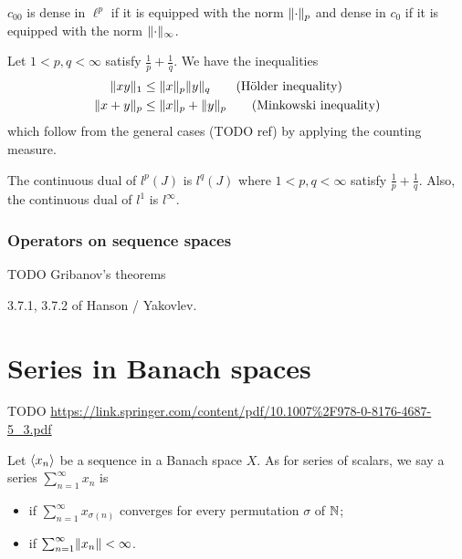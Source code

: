 \begin{lemma}
$c_{00}$ is dense in $\ell^p$ if it is equipped with the norm $\lVert\cdot\rVert_p$ and dense in $c_0$ if it is equipped with the norm $\lVert\cdot\rVert_\infty$.
\end{lemma}

Let $1<p,q<\infty$ satisfy $\frac{1}{p}+\frac{1}{q}$. We have the inequalities
\begin{align*}
\lVert xy\rVert_1 &\leq \lVert x\rVert_p\lVert y\rVert_q\qquad\text{(Hölder inequality)} \\
\lVert x+y\rVert_p &\leq \lVert x\rVert_p+\lVert y\rVert_p\qquad\text{(Minkowski inequality)}
\end{align*}
which follow from the general cases (TODO ref) by applying the counting measure.

\begin{proposition}
The continuous dual of $l^p(J)$ is $l^q(J)$ where $1<p,q<\infty$ satisfy $\frac{1}{p}+\frac{1}{q}$.
Also, the continuous dual of $l^1$ is $l^\infty$.
\end{proposition}

\subsubsection{Operators on sequence spaces}
TODO Gribanov's theorems

3.7.1, 3.7.2 of Hanson / Yakovlev.

\section{Series in Banach spaces}
TODO
\url{https://link.springer.com/content/pdf/10.1007%2F978-0-8176-4687-5_3.pdf}
\begin{definition}
Let $\left\langle x_n \right\rangle$ be a sequence in a Banach space $X$. As for series of scalars, we say a series $\sum_{n=1}^\infty x_n$ is
\begin{itemize}
\item {} if $\sum_{n=1}^\infty x_{\sigma(n)}$ converges for every permutation $\sigma$ of $\mathbb{N}$;
\item {} if $\sum_{n=1}^\infty \lVert x_n\rVert < \infty$.
\end{itemize}
\end{definition}

